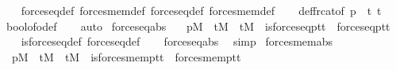 \begin{isabellebody}
%
\isadelimproof
\ \ %
\endisadelimproof
%
\isatagproof
{}\isamarkupfalse%
\ forces{\isacharunderscore}{\kern0pt}eq{\isacharprime}{\kern0pt}{\isacharunderscore}{\kern0pt}def\ forces{\isacharunderscore}{\kern0pt}mem{\isacharprime}{\kern0pt}{\isacharunderscore}{\kern0pt}def\ forces{\isacharunderscore}{\kern0pt}eq{\isacharunderscore}{\kern0pt}def\ forces{\isacharunderscore}{\kern0pt}mem{\isacharunderscore}{\kern0pt}def\isanewline
\ \ \isamarkupfalse%
\ def{\isacharunderscore}{\kern0pt}frc{\isacharunderscore}{\kern0pt}at{\isacharbrackleft}{\kern0pt}of\ p\ {}\ t{}\ t{}{\isacharbrackright}{\kern0pt}\ \ \isamarkupfalse%
\ bool{\isacharunderscore}{\kern0pt}of{\isacharunderscore}{\kern0pt}o{\isacharunderscore}{\kern0pt}def\isanewline
\ \ \isamarkupfalse%
\ auto%
\endisatagproof
{\isafoldproof}%
%
\isadelimproof
\isanewline
%
\endisadelimproof
\isanewline
{}\isamarkupfalse%
\ forces{\isacharunderscore}{\kern0pt}eq{\isacharunderscore}{\kern0pt}abs\ {\isacharcolon}{\kern0pt}\isanewline
\ \ {\isachardoublequoteopen}{\isasymlbrakk}p{\isasymin}M\ {\isacharsemicolon}{\kern0pt}\ t{}{\isasymin}M\ {\isacharsemicolon}{\kern0pt}\ t{}{\isasymin}M{\isasymrbrakk}\ {\isasymLongrightarrow}\ is{\isacharunderscore}{\kern0pt}forces{\isacharunderscore}{\kern0pt}eq{\isacharparenleft}{\kern0pt}p{\isacharcomma}{\kern0pt}t{}{\isacharcomma}{\kern0pt}t{}{\isacharparenright}{\kern0pt}\ {\isasymlongleftrightarrow}\ forces{\isacharunderscore}{\kern0pt}eq{\isacharparenleft}{\kern0pt}p{\isacharcomma}{\kern0pt}t{}{\isacharcomma}{\kern0pt}t{}{\isacharparenright}{\kern0pt}{\isachardoublequoteclose}\isanewline
%
\isadelimproof
\ \ %
\endisadelimproof
%
\isatagproof
{}\isamarkupfalse%
\ is{\isacharunderscore}{\kern0pt}forces{\isacharunderscore}{\kern0pt}eq{\isacharunderscore}{\kern0pt}def\ forces{\isacharunderscore}{\kern0pt}eq{\isacharunderscore}{\kern0pt}def\isanewline
\ \ \isamarkupfalse%
\ forces{\isacharunderscore}{\kern0pt}eq{\isacharprime}{\kern0pt}{\isacharunderscore}{\kern0pt}abs\ \isamarkupfalse%
\ simp%
\endisatagproof
{\isafoldproof}%
%
\isadelimproof
\isanewline
%
\endisadelimproof
\isanewline
{}\isamarkupfalse%
\ forces{\isacharunderscore}{\kern0pt}mem{\isacharunderscore}{\kern0pt}abs\ {\isacharcolon}{\kern0pt}\isanewline
\ \ {\isachardoublequoteopen}{\isasymlbrakk}p{\isasymin}M\ {\isacharsemicolon}{\kern0pt}\ t{}{\isasymin}M\ {\isacharsemicolon}{\kern0pt}\ t{}{\isasymin}M{\isasymrbrakk}\ {\isasymLongrightarrow}\ is{\isacharunderscore}{\kern0pt}forces{\isacharunderscore}{\kern0pt}mem{\isacharparenleft}{\kern0pt}p{\isacharcomma}{\kern0pt}t{}{\isacharcomma}{\kern0pt}t{}{\isacharparenright}{\kern0pt}\ {\isasymlongleftrightarrow}\ forces{\isacharunderscore}{\kern0pt}mem{\isacharparenleft}{\kern0pt}p{\isacharcomma}{\kern0pt}t{}{\isacharcomma}{\kern0pt}t{}{\isacharparenright}{\kern0pt}{\isachardoublequoteclose}\isanewline

\end{isabellebody}
